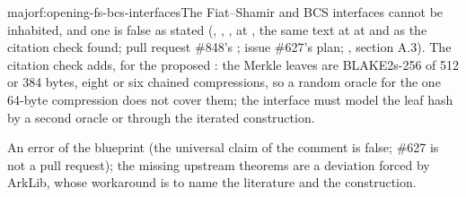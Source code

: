 \begin{finding}{major}{f:opening-fs-bcs-interfaces}{The Fiat--Shamir and BCS interfaces cannot be inhabited, and one is false as stated}
  (,
, ,
 at , the same text at 
at  and 
as the citation check found; pull request \#848's
; issue \#627's plan; , section A.3). The citation check adds, for the proposed
: the Merkle leaves are BLAKE2s-256 of 512 or 384 bytes, eight or six chained
compressions, so a random oracle for the one 64-byte compression does not cover them; the interface
must model the leaf hash by a second oracle or through the iterated construction.

 An error of the blueprint (the universal claim of the comment is false; \#627
is not a pull request); the missing upstream theorems are a deviation forced by ArkLib, whose
workaround is to name the literature and the construction.


\end{finding}
